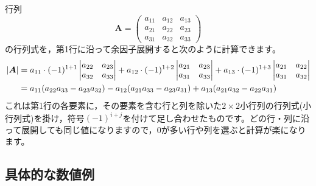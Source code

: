 \documentclass[dvipsnames]{ltjsarticle}
\begin{document}
行列
\[
\bm{A} = \begin{pmatrix}
a_{11} & a_{12} & a_{13} \\
a_{21} & a_{22} & a_{23} \\
a_{31} & a_{32} & a_{33}
\end{pmatrix}
\]
の行列式を，第1行に沿って余因子展開すると次のように計算できます。
\begin{align}
|\bm{A}| &= a_{11} \cdot (-1)^{1+1} \begin{vmatrix} a_{22} & a_{23} \\ a_{32} & a_{33} \end{vmatrix}
+ a_{12} \cdot (-1)^{1+2} \begin{vmatrix} a_{21} & a_{23} \\ a_{31} & a_{33} \end{vmatrix}
+ a_{13} \cdot (-1)^{1+3} \begin{vmatrix} a_{21} & a_{22} \\ a_{31} & a_{32} \end{vmatrix} \notag \\
&= a_{11}(a_{22}a_{33} - a_{23}a_{32}) - a_{12}(a_{21}a_{33} - a_{23}a_{31}) + a_{13}(a_{21}a_{32} - a_{22}a_{31})
\end{align}
これは第1行の各要素に，その要素を含む行と列を除いた$2 \times 2$小行列の行列式(小行列式)を掛け，符号$(-1)^{i+j}$を付けて足し合わせたものです。どの行・列に沿って展開しても同じ値になりますので，$0$が多い行や列を選ぶと計算が楽になります。

\subsection{具体的な数値例}
\end{document}
